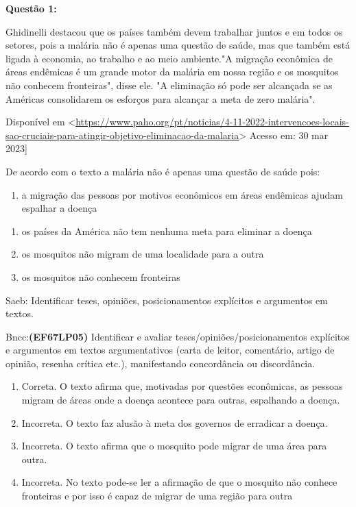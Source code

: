 {

\textbf{Questão 1:}

Ghidinelli destacou que os países também devem trabalhar juntos e em
todos os setores, pois a malária não é apenas uma questão de saúde, mas
que também está ligada à economia, ao trabalho e ao meio ambiente."A
migração econômica de áreas endêmicas é um grande motor da malária em
nossa região e os mosquitos não conhecem fronteiras", disse ele. "A
eliminação só pode ser alcançada se as Américas consolidarem os esforços
para alcançar a meta de zero malária".

Disponível em
\textless{}\href{https://www.paho.org/pt/noticias/4-11-2022-intervencoes-locais-sao-cruciais-para-atingir-objetivo-eliminacao-da-malaria}{\uline{https://www.paho.org/pt/noticias/4-11-2022-intervencoes-locais-sao-cruciais-para-atingir-objetivo-eliminacao-da-malaria}}\textgreater{}
Acesso em: 30 mar 2023{]}

De acordo com o texto a malária não é apenas uma questão de saúde pois:

\begin{enumerate}
\def\labelenumi{\alph{enumi})}
\tightlist
\item
  a migração das pessoas por motivos econômicos em áreas endêmicas
  ajudam espalhar a doença
\end{enumerate}

\begin{enumerate}
\def\labelenumi{\alph{enumi})}
\item
  os países da América não tem nenhuma meta para eliminar a doença
\item
  os mosquitos não migram de uma localidade para a outra
\item
  os mosquitos não conhecem fronteiras
\end{enumerate}

Saeb: Identificar teses, opiniões, posicionamentos explícitos e
argumentos em textos.

Bncc:\textbf{(EF67LP05)} Identificar e avaliar
teses/opiniões/posicionamentos explícitos e argumentos em textos
argumentativos (carta de leitor, comentário, artigo de opinião, resenha
crítica etc.), manifestando concordância ou discordância.

\begin{enumerate}
\def\labelenumi{\arabic{enumi}.}
\item
  Correta. O texto afirma que, motivadas por questões econômicas, as
  pessoas migram de áreas onde a doença acontece para outras, espalhando
  a doença.
\item
  Incorreta. O texto faz alusão à meta dos governos de erradicar a
  doença.
\item
  Incorreta. O texto afirma que o mosquito pode migrar de uma área para
  outra.
\item
  Incorreta. No texto pode-se ler a afirmação de que o mosquito não
  conhece fronteiras e por isso é capaz de migrar de uma região para
  outra
\end{enumerate}

}
